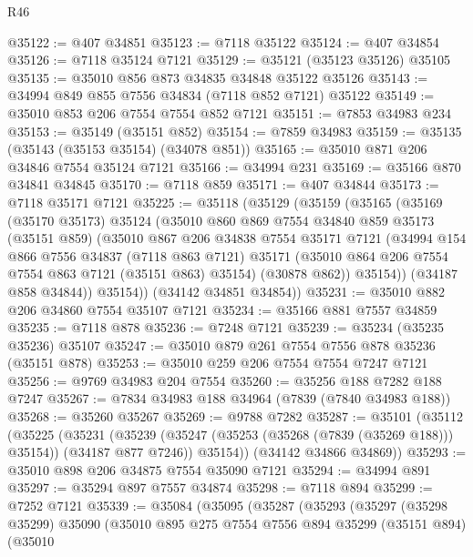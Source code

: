 \begin{lexlean}{R46}
\begin{coremodule}
@35122 := @407 @34851
@35123 := @7118 @35122
@35124 := @407 @34854
@35126 := @7118 @35124 @7121
@35129 := @35121 (@35123 @35126) @35105
@35135 := @35010 @856 @873 @34835 @34848 @35122 @35126
@35143 := @34994 @849 @855 @7556 @34834 (@7118 @852 @7121) @35122
@35149 := @35010 @853 @206 @7554 @7554 @852 @7121
@35151 := @7853 @34983 @234
@35153 := @35149 (@35151 @852)
@35154 := @7859 @34983
@35159 := @35135 (@35143 (@35153 @35154) (@34078 @851))
@35165 := @35010 @871 @206 @34846 @7554 @35124 @7121
@35166 := @34994 @231
@35169 := @35166 @870 @34841 @34845
@35170 := @7118 @859
@35171 := @407 @34844
@35173 := @7118 @35171 @7121
@35225 := @35118
    (@35129
      (@35159
        (@35165
          (@35169
            (@35170 @35173)
            @35124
            (@35010
              @860
              @869
              @7554
              @34840
              @859
              @35173
              (@35151 @859)
              (@35010
                @867
                @206
                @34838
                @7554
                @35171
                @7121
                (@34994
                  @154
                  @866
                  @7556
                  @34837
                  (@7118 @863 @7121)
                  @35171
                  (@35010 @864 @206 @7554 @7554 @863 @7121 (@35151 @863) @35154)
                  (@30878 @862))
                @35154))
            (@34187 @858 @34844))
          @35154))
      (@34142 @34851 @34854))
@35231 := @35010 @882 @206 @34860 @7554 @35107 @7121
@35234 := @35166 @881 @7557 @34859
@35235 := @7118 @878
@35236 := @7248 @7121
@35239 := @35234 (@35235 @35236) @35107
@35247 := @35010 @879 @261 @7554 @7556 @878 @35236 (@35151 @878)
@35253 := @35010 @259 @206 @7554 @7554 @7247 @7121
@35256 := @9769 @34983 @204 @7554
@35260 := @35256 @188 @7282 @188 @7247
@35267 := @7834 @34983 @188 @34964 (@7839 (@7840 @34983 @188))
@35268 := @35260 @35267
@35269 := @9788 @7282
@35287 := @35101
    (@35112
      (@35225
        (@35231
          (@35239 (@35247 (@35253 (@35268 (@7839 (@35269 @188))) @35154)) (@34187 @877 @7246))
          @35154))
      (@34142 @34866 @34869))
@35293 := @35010 @898 @206 @34875 @7554 @35090 @7121
@35294 := @34994 @891
@35297 := @35294 @897 @7557 @34874
@35298 := @7118 @894
@35299 := @7252 @7121
@35339 := @35084
    (@35095
      (@35287
        (@35293
          (@35297
            (@35298 @35299)
            @35090
            (@35010
              @895
              @275
              @7554
              @7556
              @894
              @35299
              (@35151 @894)
              (@35010

\end{coremodule}
\end{lexlean}
